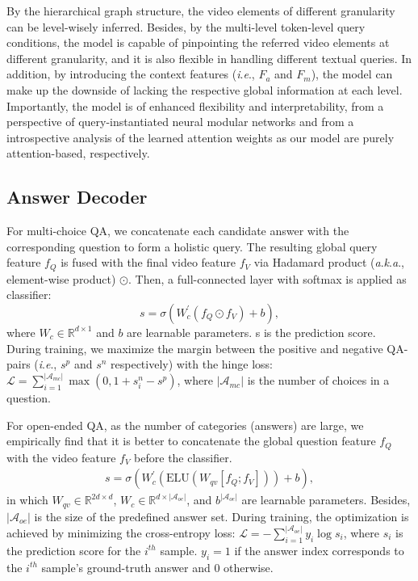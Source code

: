 \documentclass[letterpaper]{article} \usepackage{aaai21}  \usepackage{times}  \usepackage{helvet} \usepackage{courier}  \usepackage[hyphens]{url}  \usepackage{graphicx} \urlstyle{rm} \def\UrlFont{\rm}  \usepackage{natbib}  \usepackage{caption} \usepackage{color, colortbl}
\newcommand{\ie}{\textit{i}.\textit{e}.}
\newcommand{\aka}{\textit{a}.\textit{k}.\textit{a}.}
\begin{document}
By the hierarchical graph structure, the video elements of different granularity can be level-wisely inferred. Besides, by the multi-level token-level query conditions, the model is capable of pinpointing the referred video elements at different granularity, and it is also flexible in handling different textual queries. In addition, by introducing the context features (\ie, $F_a$ and $F_m$), the model can make up the downside of lacking the respective global information at each level. Importantly, the model is of enhanced flexibility and interpretability, from a perspective of query-instantiated neural modular networks \cite{hu2018explainable} and from a introspective analysis of the learned attention weights as our model are purely attention-based, respectively. 


\subsection{Answer Decoder}
For multi-choice QA, we concatenate each candidate answer with the corresponding question to form a holistic query. The resulting global query feature $f_Q$ is fused with the final video feature $f_V$ via Hadamard product (\aka, element-wise product) $\odot$. Then, a full-connected layer with softmax is applied as classifier: 
\begin{equation}
    s = \sigma(W_c^\mathrm{'}(f_Q \odot f_V)+b),
\end{equation}
where $W_c \in \mathbb{R}^{d\times 1}$ and $b$ are learnable parameters. s is the prediction score. During training, we maximize the margin between the positive and negative QA-pairs (\ie, $s^p$ and $s^n$ respectively) with the hinge loss:
$\mathcal{L}=\sum\nolimits_{i=1}^{|\mathcal{A}_{mc}|} \max(0, 1+s_i^n-s^p)$,
where $|\mathcal{A}_{mc}|$ is the number of choices in a question.

For open-ended QA, as the number of categories (answers) are large, we empirically find that it is better to concatenate the global question feature $f_Q$ with the video feature $f_V$ before the classifier.
\begin{align}
s = \sigma(W_c^\mathrm{'}(\mathrm{ELU}(W_{qv}[f_Q; f_V]))+b),
\end{align}
in which $W_{qv}\in \mathbb{R}^{2d\times d}$, $W_c \in \mathbb{R}^{d \times |\mathcal{A}_{oe}|}$, and $b^{|\mathcal{A}_{oe}|}$ are learnable parameters. Besides, $|\mathcal{A}_{oe}|$ is the size of the predefined answer set. During training, the optimization is achieved by minimizing the cross-entropy loss:
$ \mathcal{L}= -\sum\nolimits_{i=1}^{|\mathcal{A}_{oe}|} y_i \log s_i$,
where $s_i$ is the prediction score for the $i^{th}$ sample. $y_i=1$ if the answer index corresponds to the $i^{th}$ sample's ground-truth answer and 0 otherwise.
\end{document}
